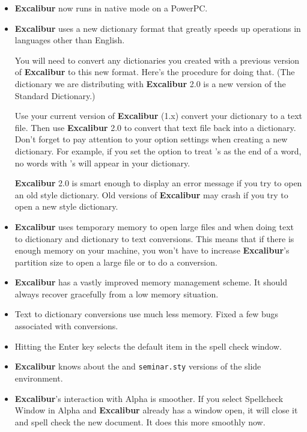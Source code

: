 \documentclass[11pt,titlepage]{article}
\newcommand{\ex}{\textbf{Excalibur}}
\newcommand{\SLiTeX}{\latex{\textsc{Sli\TeX}}\html{SliTeX}}
\begin{document}
\begin{itemize}

\item \ex{} now runs in native mode on a PowerPC.

\item \ex{} uses a new dictionary format that greatly speeds up
  operations in languages other than English.

  You will need to convert any dictionaries you created with a
  previous version of \ex{} to this new format.  Here's the procedure
  for doing that.  (The dictionary we are distributing with \ex{} 2.0
  is a new version of the Standard Dictionary.)

  Use your current version of \ex{} (1.x) convert your dictionary to a
  text file.  Then use \ex{} 2.0 to convert that text file back into a
  dictionary.  Don't forget to pay attention to your option settings
  when creating a new dictionary.  For example, if you set the option
  to treat 's as the end of a word, no words with 's will appear in
  your dictionary.

  \ex{} 2.0 is smart enough to display an error message if you try to
  open an old style dictionary.  Old versions of \ex{} may crash if
  you try to open a new style dictionary.

\item \ex{} uses temporary memory to open large files and when doing
  text to dictionary and dictionary to text conversions.  This means
  that if there is enough memory on your machine, you won't have to
  increase \ex's partition size to open a large file or to do a
  conversion.

\item \ex{} has a vastly improved memory management scheme.  It should
  always recover gracefully from a low memory situation.

\item Text to dictionary conversions use much less memory.  Fixed a
  few bugs associated with conversions.

\item Hitting the Enter key selects the default item in the spell
  check window.

\item \ex{} knows about the \SLiTeX{} and \texttt{seminar.sty}
  versions of the slide environment.

\item \ex's interaction with Alpha is smoother.  If you select
  Spellcheck Window in Alpha and \ex{} already has a window open, it
  will close it and spell check the new document.  It does this more
  smoothly now.


\end{itemize}
\end{document}
